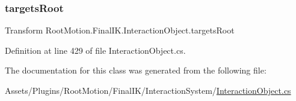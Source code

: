\subsubsection{\texorpdfstring{targets\+Root}{targetsRoot}}
{\footnotesize\ttfamily Transform Root\+Motion.\+Final\+I\+K.\+Interaction\+Object.\+targets\+Root\hspace{0.3cm}{\ttfamily [get]}}



Definition at line 429 of file Interaction\+Object.\+cs.



The documentation for this class was generated from the following file\+:\begin{DoxyCompactItemize}
\item 
Assets/\+Plugins/\+Root\+Motion/\+Final\+I\+K/\+Interaction\+System/\mbox{\hyperlink{_interaction_object_8cs}{Interaction\+Object.\+cs}}\end{DoxyCompactItemize}
